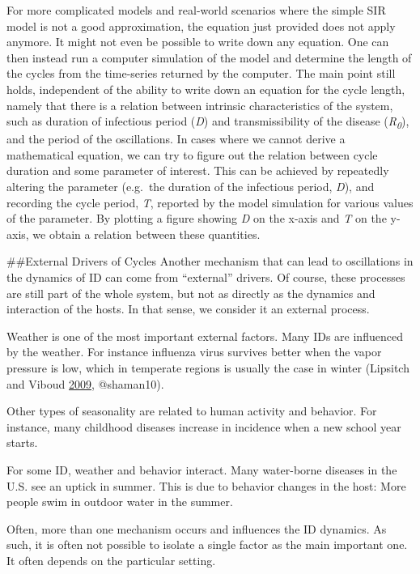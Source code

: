 \documentclass[]{book}
\theoremstyle{definition}
\theoremstyle{definition}
\theoremstyle{definition}
\theoremstyle{remark}
\begin{document}
For more complicated models and real-world scenarios where the simple
SIR model is not a good approximation, the equation just provided does
not apply anymore. It might not even be possible to write down any
equation. One can then instead run a computer simulation of the model
and determine the length of the cycles from the time-series returned by
the computer. The main point still holds, independent of the ability to
write down an equation for the cycle length, namely that there is a
relation between intrinsic characteristics of the system, such as
duration of infectious period (\emph{D}) and transmissibility of the
disease (\emph{R\textsubscript{0}}), and the period of the oscillations.
In cases where we cannot derive a mathematical equation, we can try to
figure out the relation between cycle duration and some parameter of
interest. This can be achieved by repeatedly altering the parameter
(e.g.~the duration of the infectious period, \emph{D}), and recording
the cycle period, \emph{T}, reported by the model simulation for various
values of the parameter. By plotting a figure showing \emph{D} on the
x-axis and \emph{T} on the y-axis, we obtain a relation between these
quantities.

\#\#External Drivers of Cycles Another mechanism that can lead to
oscillations in the dynamics of ID can come from ``external'' drivers.
Of course, these processes are still part of the whole system, but not
as directly as the dynamics and interaction of the hosts. In that sense,
we consider it an external process.

Weather is one of the most important external factors. Many IDs are
influenced by the weather. For instance influenza virus survives better
when the vapor pressure is low, which in temperate regions is usually
the case in winter (Lipsitch and Viboud
\protect\hyperlink{ref-lipsitch09}{2009}, @shaman10).

Other types of seasonality are related to human activity and behavior.
For instance, many childhood diseases increase in incidence when a new
school year starts.

For some ID, weather and behavior interact. Many water-borne diseases in
the U.S. see an uptick in summer. This is due to behavior changes in the
host: More people swim in outdoor water in the summer.

Often, more than one mechanism occurs and influences the ID dynamics. As
such, it is often not possible to isolate a single factor as the main
important one. It often depends on the particular setting.
\end{document}
